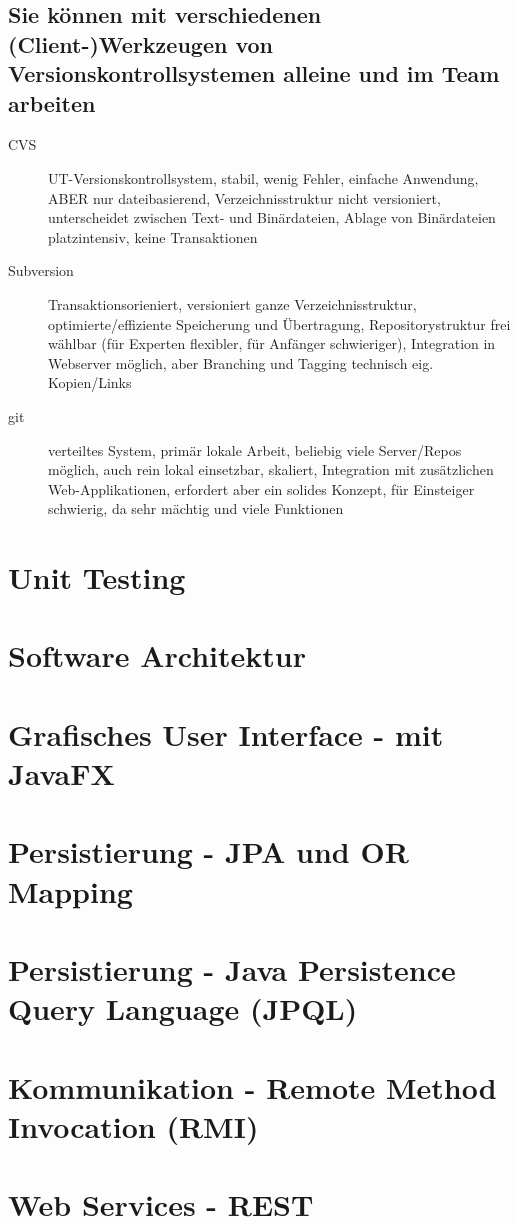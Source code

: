 \documentclass[a4paper]{article}
\begin{document}
		\subsection{Sie können mit verschiedenen (Client-)Werkzeugen von Versionskontrollsystemen alleine und im Team arbeiten}
		
		\begin{description}
			\item[CVS] UT-Versionskontrollsystem, stabil, wenig Fehler, einfache Anwendung, ABER nur dateibasierend, Verzeichnisstruktur nicht versioniert, unterscheidet zwischen Text- und Binärdateien, Ablage von Binärdateien platzintensiv, keine Transaktionen
			\item[Subversion] Transaktionsorieniert, versioniert ganze Verzeichnisstruktur, optimierte/effiziente Speicherung und Übertragung, Repositorystruktur frei wählbar (für Experten flexibler, für Anfänger schwieriger), Integration in Webserver möglich, aber Branching und Tagging technisch eig. Kopien/Links
			\item[git] verteiltes System, primär lokale Arbeit, beliebig viele Server/Repos möglich, auch rein lokal einsetzbar, skaliert, Integration mit zusätzlichen Web-Applikationen, erfordert aber ein solides Konzept, für Einsteiger schwierig, da sehr mächtig und viele Funktionen
		\end{description}
	
	\newpage
	\section{Unit Testing}
		
		
	\newpage
	\section{Software Architektur}
		
		
	\newpage
	\section{Grafisches User Interface - mit JavaFX}	
		
		
	\newpage
	\section{Persistierung - JPA und OR Mapping}
	
		
	\newpage
	\section{Persistierung - Java Persistence Query Language (JPQL)}
		
		
	\newpage
	\section{Kommunikation - Remote Method Invocation (RMI)}
	
	
	\newpage
	\section{Web Services - REST}
	
		
		
\end{document}
